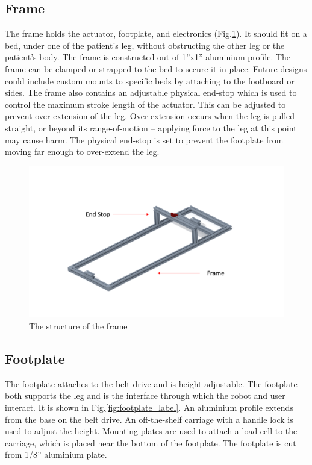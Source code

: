 \documentclass[12pt]{report}
\begin{document}
	\subsection{Frame}

	The frame holds the actuator, footplate, and electronics (Fig.\ref{fig:frame}). It should fit on a bed, under one of the patient's leg, without obstructing the other leg or the patient's body. The frame is constructed out of 1''x1'' aluminium profile. The frame can be clamped or strapped to the bed to secure it in place. Future designs could include custom mounts to specific beds by attaching to the footboard or sides. The frame also contains an adjustable physical end-stop which is used to control the maximum stroke length of the actuator. This can be adjusted to prevent over-extension of the leg. Over-extension occurs when the leg is pulled straight, or beyond its range-of-motion -- applying force to the leg at this point may cause harm. The physical end-stop is set to prevent the footplate from moving far enough to over-extend the leg. 
	

	\begin{figure}[h] 
		\centering
		\includegraphics[width=\linewidth]{frame}
		\caption{The structure of the frame}
		\label{fig:frame}
	\end{figure}
	
	
	
	\subsection{Footplate}
	
	The footplate attaches to the belt drive and is height adjustable. The footplate both supports the leg and is 
the interface through which the robot and user interact. It is shown in Fig.\ref{fig:footplate_label}. An aluminium profile extends from the base on the belt drive. An off-the-shelf carriage with a handle lock is used to adjust the height. Mounting plates are used to attach a load cell to the carriage, which is placed near the bottom of the footplate. The footplate is cut from 1/8'' aluminium plate. 
	
\end{document}
